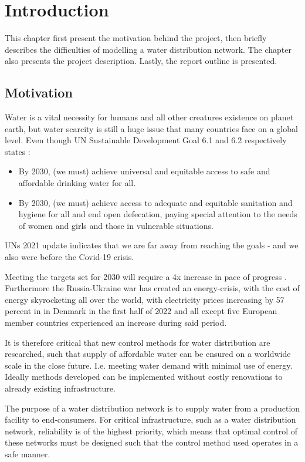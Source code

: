 \chapter{Introduction}\label{chap:Introduction}
This chapter first present the motivation behind the project, then briefly describes the difficulties of modelling a water distribution network. The chapter also presents the project description. Lastly, the report outline is presented.

\section{Motivation}\label{sec:introMotivation}
Water is a vital necessity for humans and all other creatures existence on planet earth, but water scarcity is still a huge issue that many countries face on a global level. Even though UN Sustainable Development Goal 6.1 and 6.2 respectively states \cite{UN_SDG6162}:

\begin{itemize}
\item By 2030, (we must) achieve universal and equitable access to safe and affordable drinking water for all.
\item By 2030, (we must) achieve access to adequate and equitable sanitation and hygiene for all and end open defecation, paying special attention to the needs of women and girls and those in vulnerable situations.
\end{itemize}

UNs 2021 update \cite{FAOandUNWater2021} indicates that we are far away from reaching the goals - and we also were before the Covid-19 crisis. 

Meeting the targets set for 2030 will require a 4x increase in pace of progress \cite{UN_SDG6}. Furthermore the Russia-Ukraine war has created an energy-crisis, with the cost of energy skyrocketing all over the world, with electricity prices increasing by 57 percent in in Denmark in the first half of 2022 \cite{EuroStat} and all except five European member countries experienced an increase during said period.   

It is therefore critical that new control methods for water distribution are researched, such that supply of affordable water can be ensured on a worldwide scale in the close future. I.e. meeting water demand with minimal use of energy. Ideally methods developed can be implemented without costly renovations to already existing infrastructure. 

The purpose of a water distribution network is to supply water from a production facility to end-consumers. For critical infrastructure, such as a water distribution network, reliability is of the highest priority, which means that optimal control of these networks must be designed such that the control method used operates in a safe manner. 

